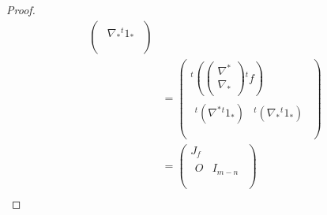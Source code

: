 \documentclass[dvipdfmx]{jsarticle}
\begin{document}
\begin{proof}
\begin{align*}
\begin{pmatrix}
\begin{matrix}
  \nabla_{*} {}^{t} 1_{*} \\
 \end{matrix} \\
\end{pmatrix}\\
&= \begin{pmatrix} {}^{t} \left( 
 \begin{pmatrix}
  \nabla^{*} \\
  \nabla_{*} \\
 \end{pmatrix} {}^{t}f \right) \\
\begin{matrix}
  {}^{t} \left( \nabla^{*} {}^{t} 1_{*} \right) & {}^{t} \left( \nabla_{*} {}^{t} 1_{*} \right) \\
\end{matrix} \\
\end{pmatrix} \\
&= \begin{pmatrix} J_{f} \\
\begin{matrix}
  O & {I}_{m - n} \\
\end{matrix} \\
\end{pmatrix} \\
\end{align*}
\begin{comment}
\begin{align*}
J_{F} &= \begin{pmatrix}
\partial_{1}f_{1} & \partial_{2}f_{1} & \cdots & \partial_{n}f_{1} & \partial_{n + 1}f_{1} & \partial_{n + 2}f_{1} & \cdots & \partial_{m}f_{1} \\
\partial_{1}f_{2} & \partial_{2}f_{2} & \cdots & \partial_{n}f_{2} & \partial_{n + 1}f_{2} & \partial_{n + 2}f_{2} & \cdots & \partial_{m}f_{2} \\
 \vdots & \vdots & \ddots & \vdots & \vdots & \vdots & \ddots & \vdots \\
\partial_{1}f_{n} & \partial_{2}f_{n} & \cdots & \partial_{n}f_{n} & \partial_{n + 1}f_{n} & \partial_{n + 2}f_{n} & \cdots & \partial_{m}f_{n} \\
\partial_{1}x_{n + 1} & \partial_{2}x_{n + 1} & \cdots & \partial_{n}x_{n + 1} & \partial_{n + 1}x_{n + 1} & \partial_{n + 2}x_{n + 1} & \cdots & \partial_{m}x_{n + 1} \\
\partial_{1}x_{n + 2} & \partial_{2}x_{n + 2} & \cdots & \partial_{n}x_{n + 2} & \partial_{n + 1}x_{n + 2} & \partial_{n + 2}x_{n + 2} & \cdots & \partial_{m}x_{n + 2} \\

\end{comment}
\end{proof}
\end{document}
